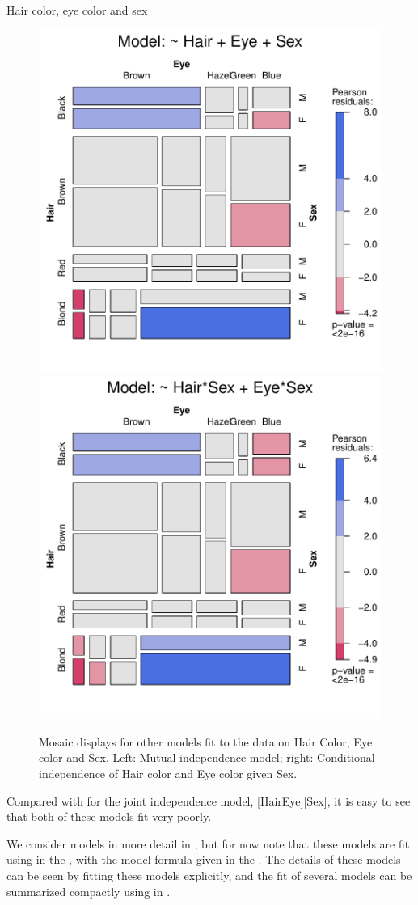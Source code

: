 \documentclass[10pt,krantz2]{krantz}\usepackage[]{graphicx}\usepackage[]{color}
\newenvironment{knitrout}{}{} %
\renewenvironment{knitrout}{\small\renewcommand{\baselinestretch}{.85}}{} %
\begin{document}
\begin{Example}[HEC2]{Hair color, eye color and sex}
\begin{knitrout}
\begin{figure}[!htbp]
\centerline{\includegraphics[width=.49\textwidth]{ch05/fig/HEC-mos2-1} 
\includegraphics[width=.49\textwidth]{ch05/fig/HEC-mos2-2} }

\caption[Mosaic displays for other models fit to the data on Hair Color, Eye color and Sex]{Mosaic displays for other models fit to the data on Hair Color, Eye color and Sex.  Left: Mutual independence model; right: Conditional independence of Hair color and Eye color given Sex.\label{fig:HEC-mos2}}
\end{figure}


\end{knitrout}
\noindent Compared with  for the joint independence model, [HairEye][Sex],
it is easy to see that both of these models fit very poorly.

We consider \loglin models in more detail in , but for now
note that these models are fit using  in the ,
with the model formula given in the .  The details of these
models can be seen by fitting these models explicitly, and the fit of
several models can be summarized compactly using 
in .


\end{Example}
\end{document}
